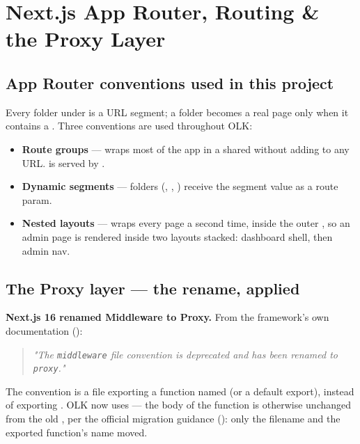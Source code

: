 \chapter{Next.js App Router, Routing \& the Proxy Layer}
\label{ch:proxy}

\section{App Router conventions used in this project}

Every folder under  is a URL segment; a folder becomes a real page only when it contains a . Three conventions are used throughout OLK:

\begin{itemize}
  \item \textbf{Route groups} —  wraps most of the app in a shared  without adding  to any URL.  is served by .
  \item \textbf{Dynamic segments} — \pathname{[id]} folders (, , ) receive the segment value as a route param.
  \item \textbf{Nested layouts} —  wraps every  page a second time, inside the outer , so an admin page is rendered inside two layouts stacked: dashboard shell, then admin nav.
\end{itemize}

\section{The Proxy layer — the rename, applied}

\begin{olknote}
\textbf{Next.js 16 renamed Middleware to Proxy.} From the framework's own documentation ():

\begin{quote}
\emph{"The \texttt{middleware} file convention is deprecated and has been renamed to \texttt{proxy}."}
\end{quote}

The convention is a  file exporting a function named  (or a default export), instead of  exporting . OLK now uses  — the body of the function is otherwise unchanged from the old , per the official migration guidance (): only the filename and the exported function's name moved.
\end{olknote}

